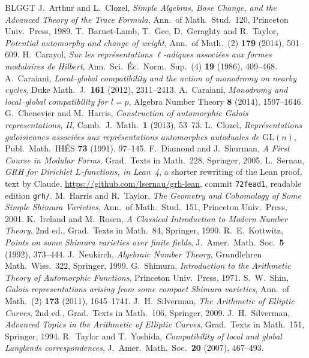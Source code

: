 \documentclass[reqno]{amsart}
\theoremstyle{definition}
\theoremstyle{plain}
\begin{document}
\begin{thebibliography}{BLGGT}
 J.~Arthur and L.~Clozel, \emph{Simple Algebras, Base Change, and the Advanced Theory of the Trace Formula}, Ann.\ of Math.\ Stud.\ 120, Princeton Univ.\ Press, 1989.
 T.~Barnet-Lamb, T.~Gee, D.~Geraghty and R.~Taylor, \emph{Potential automorphy and change of weight}, Ann.\ of Math.\ (2) \textbf{179} (2014), 501--609.
 H.~Carayol, \emph{Sur les repr\'esentations \(\ell\)-adiques associ\'ees aux formes modulaires de Hilbert}, Ann.\ Sci.\ \'Ec.\ Norm.\ Sup.\ (4) \textbf{19} (1986), 409--468.
 A.~Caraiani, \emph{Local--global compatibility and the action of monodromy on nearby cycles}, Duke Math.\ J.\ \textbf{161} (2012), 2311--2413.
 A.~Caraiani, \emph{Monodromy and local--global compatibility for \(l = p\)}, Algebra Number Theory \textbf{8} (2014), 1597--1646.
 G.~Chenevier and M.~Harris, \emph{Construction of automorphic Galois representations, II}, Camb.\ J.\ Math.\ \textbf{1} (2013), 53--73.
 L.~Clozel, \emph{Repr\'esentations galoisiennes associ\'ees aux repr\'esentations automorphes autoduales de \(\mathrm{GL}(n)\)}, Publ.\ Math.\ IH\'ES \textbf{73} (1991), 97--145.
 F.~Diamond and J.~Shurman, \emph{A First Course in Modular Forms}, Grad.\ Texts in Math.\ 228, Springer, 2005.
 L.~Sernau, \emph{GRH for Dirichlet \(L\)-functions, in Lean~4}, a shorter rewriting of the Lean proof, text by Claude, \url{https://github.com/lsernau/grh-lean}, commit \texttt{72fead1}, readable edition \texttt{grh/}.
 M.~Harris and R.~Taylor, \emph{The Geometry and Cohomology of Some Simple Shimura Varieties}, Ann.\ of Math.\ Stud.\ 151, Princeton Univ.\ Press, 2001.
 K.~Ireland and M.~Rosen, \emph{A Classical Introduction to Modern Number Theory}, 2nd ed., Grad.\ Texts in Math.\ 84, Springer, 1990.
 R.~E.~Kottwitz, \emph{Points on some Shimura varieties over finite fields}, J.\ Amer.\ Math.\ Soc.\ \textbf{5} (1992), 373--444.
 J.~Neukirch, \emph{Algebraic Number Theory}, Grundlehren Math.\ Wiss.\ 322, Springer, 1999.
 G.~Shimura, \emph{Introduction to the Arithmetic Theory of Automorphic Functions}, Princeton Univ.\ Press, 1971.
 S.~W.~Shin, \emph{Galois representations arising from some compact Shimura varieties}, Ann.\ of Math.\ (2) \textbf{173} (2011), 1645--1741.
 J.~H.~Silverman, \emph{The Arithmetic of Elliptic Curves}, 2nd ed., Grad.\ Texts in Math.\ 106, Springer, 2009.
 J.~H.~Silverman, \emph{Advanced Topics in the Arithmetic of Elliptic Curves}, Grad.\ Texts in Math.\ 151, Springer, 1994.
 R.~Taylor and T.~Yoshida, \emph{Compatibility of local and global Langlands correspondences}, J.\ Amer.\ Math.\ Soc.\ \textbf{20} (2007), 467--493.
\end{thebibliography}
\end{document}

